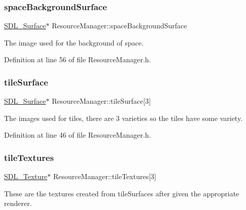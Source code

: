 \subsubsection{\texorpdfstring{spaceBackgroundSurface}{spaceBackgroundSurface}}
{\footnotesize\ttfamily \mbox{\hyperlink{struct_s_d_l___surface}{S\+D\+L\+\_\+\+Surface}}$\ast$ Resource\+Manager\+::space\+Background\+Surface}



The image used for the background of space. 



Definition at line 56 of file Resource\+Manager.\+h.

\mbox{\label{class_resource_manager_a6755a6444754c714776e51bc0fc22fa7}} 
\subsubsection{\texorpdfstring{tileSurface}{tileSurface}}
{\footnotesize\ttfamily \mbox{\hyperlink{struct_s_d_l___surface}{S\+D\+L\+\_\+\+Surface}}$\ast$ Resource\+Manager\+::tile\+Surface\mbox{[}3\mbox{]}}



The images used for tiles, there are 3 varieties so the tiles have some variety. 



Definition at line 46 of file Resource\+Manager.\+h.

\mbox{\label{class_resource_manager_a8bc1363c8eac146c6e86e1b7a8a7ae7d}} 
\subsubsection{\texorpdfstring{tileTextures}{tileTextures}}
{\footnotesize\ttfamily \mbox{\hyperlink{_s_d_l__render_8h_a17850d7f1f5de457727cb3cf66b3a7f5}{S\+D\+L\+\_\+\+Texture}}$\ast$ Resource\+Manager\+::tile\+Textures\mbox{[}3\mbox{]}}



These are the textures created from tile\+Surfaces after given the appropriate renderer. 



